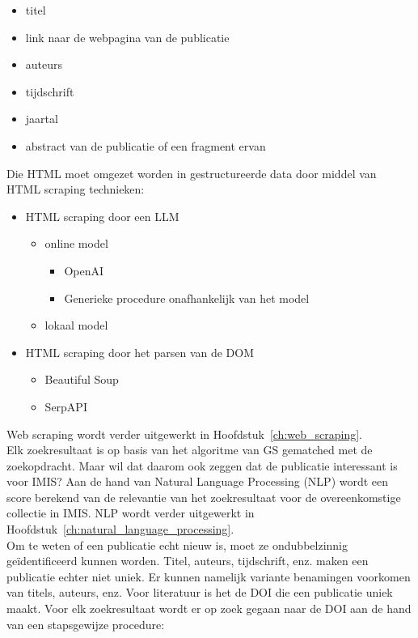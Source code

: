 \begin{itemize}
    \item titel
    \item link naar de webpagina van de publicatie
    \item auteurs
    \item tijdschrift
    \item jaartal
    \item abstract van de publicatie of een fragment ervan
\end{itemize}
Die HTML moet omgezet worden in gestructureerde data door middel van HTML scraping technieken:
\begin{itemize}
    \item HTML scraping door een LLM
    \begin{itemize}
        \item online model
        \begin{itemize}
            \item OpenAI
            \item Generieke procedure onafhankelijk van het model
        \end{itemize}
        \item lokaal model
    \end{itemize}
    \item HTML scraping door het parsen van de DOM
    \begin{itemize}
        \item Beautiful Soup
        \item SerpAPI
    \end{itemize}
\end{itemize}
Web scraping wordt verder uitgewerkt in Hoofdstuk~\ref{ch:web_scraping}.\\
Elk zoekresultaat is op basis van het algoritme van GS gematched met de zoekopdracht. Maar wil dat daarom ook zeggen dat de publicatie interessant is voor IMIS? Aan de hand van Natural Language Processing (NLP) wordt een score berekend van de relevantie van het zoekresultaat voor de overeenkomstige collectie in IMIS. NLP wordt verder uitgewerkt in Hoofdstuk~\ref{ch:natural_language_processing}.\\
Om te weten of een publicatie echt nieuw is, moet ze ondubbelzinnig geïdentificeerd kunnen worden. Titel, auteurs, tijdschrift, enz. maken een publicatie echter niet uniek. Er kunnen namelijk variante benamingen voorkomen van titels, auteurs, enz. Voor literatuur is het de DOI die een publicatie uniek maakt. Voor elk zoekresultaat wordt er op zoek gegaan naar de DOI aan de hand van een stapsgewijze procedure:
